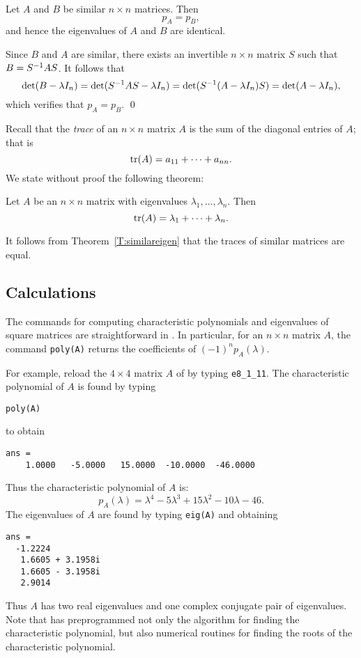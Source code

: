 \documentclass{ximera}
\begin{document}
\begin{thm}  \label{T:similareigen}
Let $A$ and $B$ be similar $n\times n$ matrices.  Then
\[
p_A = p_B,
\]
and hence the eigenvalues of $A$ and $B$ are identical.
\end{thm}  

\proof  Since $B$ and $A$ are similar, there exists an 
invertible $n\times n$ matrix $S$ such that $B=S^{-1} AS$.  It 
follows that 
\[
\det(B-\lambda I_n) = \det(S^{-1} AS-\lambda I_n)
= \det(S^{-1}(A-\lambda I_n)S) = \det(A-\lambda I_n),
\]
which verifies that $p_A=p_B$.  \qed

Recall that the {\em trace\/} of an 
$n\times n$ matrix $A$ is
the sum of the diagonal entries of $A$; that is
\[
{\rm tr}(A) = a_{11} +\cdots+ a_{nn}.
\]
We state without proof the following theorem:
\begin{thm} \label{T:tracen}
Let $A$ be an $n\times n$ matrix with eigenvalues
$\lambda_1,\ldots,\lambda_n$.  Then
\[
{\rm tr}(A) = \lambda_1 + \cdots + \lambda_n.
\]
\end{thm}

It follows from Theorem~\ref{T:similareigen} that the traces of
similar matrices are equal.


\subsection*{\Matlab Calculations}

The commands for computing characteristic polynomials and
eigenvalues of square matrices are straightforward in \Matlab.
In particular, for an $n\times n$ matrix $A$, the \Matlab command
 {\tt poly(A)} returns the coefficients of $(-1)^np_A(\lambda)$.

For example, reload the $4\times 4$ matrix $A$ of 
by typing {\tt e8\_1\_11}.  The characteristic polynomial of $A$ is
found by typing
\begin{verbatim}
poly(A)
\end{verbatim} 
to obtain
\begin{verbatim}
ans =
    1.0000   -5.0000   15.0000  -10.0000  -46.0000
\end{verbatim} 
Thus the characteristic polynomial of $A$ is:
\[
p_A(\lambda) = \lambda^4 -5\lambda^3+15\lambda^2-10\lambda-46.
\]
The eigenvalues of $A$ are found by typing {\tt eig(A)} and
obtaining
\begin{verbatim}
ans =
  -1.2224          
   1.6605 + 3.1958i
   1.6605 - 3.1958i
   2.9014 
\end{verbatim}
Thus $A$ has two real eigenvalues and one complex conjugate pair
of eigenvalues.  Note that \Matlab has preprogrammed not only
the algorithm for finding the characteristic polynomial, but
also numerical routines for finding the roots of the
characteristic polynomial.
\end{document}
